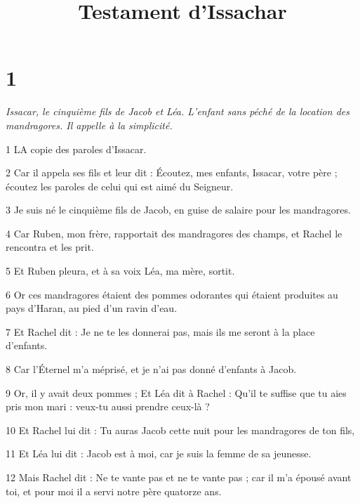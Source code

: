 

\title{Testament d'Issachar}

\chapter{1}

\par \textit{Issacar, le cinquième fils de Jacob et Léa. L'enfant sans péché de la location des mandragores. Il appelle à la simplicité.}

\par 1 LA copie des paroles d'Issacar.

\par 2 Car il appela ses fils et leur dit : Écoutez, mes enfants, Issacar, votre père ; écoutez les paroles de celui qui est aimé du Seigneur.

\par 3 Je suis né le cinquième fils de Jacob, en guise de salaire pour les mandragores.

\par 4 Car Ruben, mon frère, rapportait des mandragores des champs, et Rachel le rencontra et les prit.

\par 5 Et Ruben pleura, et à sa voix Léa, ma mère, sortit.

\par 6 Or ces mandragores étaient des pommes odorantes qui étaient produites au pays d'Haran, au pied d'un ravin d'eau.

\par 7 Et Rachel dit : Je ne te les donnerai pas, mais ils me seront à la place d'enfants.

\par 8 Car l'Éternel m'a méprisé, et je n'ai pas donné d'enfants à Jacob.

\par 9 Or, il y avait deux pommes ; Et Léa dit à Rachel : Qu'il te suffise que tu aies pris mon mari : veux-tu aussi prendre ceux-là ?

\par 10 Et Rachel lui dit : Tu auras Jacob cette nuit pour les mandragores de ton fils,

\par 11 Et Léa lui dit : Jacob est à moi, car je suis la femme de sa jeunesse.

\par 12 Mais Rachel dit : Ne te vante pas et ne te vante pas ; car il m'a épousé avant toi, et pour moi il a servi notre père quatorze ans.

